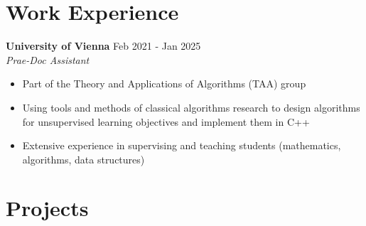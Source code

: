 \documentclass[a4paper, 10pt]{article}
\newcommand{\bulletSpace}{\vspace{-4pt}}
\newcommand{\secStartSpace}{\vspace{3pt}}
\newcommand{\secEndSpace}{\vspace{5pt}}
\newcommand{\workHeader}[3]{
\noindent \large{\textbf{\textcolor{text-color}{#1}}} \hfill \normalsize{#3}\vspace{2pt}\\
	\textit{#2}\vspace{-2pt}
}
\newcommand{\workSubHeader}[2]{
    \noindent \textit{#1} \hfill \normalsize{#2}
	\vspace{-2pt}
}
\newcommand{\boldlarger}[1]{{\large\textbf{\color{secondary}{#1}}}}
\newcommand{\justlarge}[1]{{\large \textbf{#1}}}
\begin{document}
\section{\color{highlight} \textbf{Work Experience}}
\secStartSpace
\begin{addmargin}[0.5em]{1em}
	\workHeader{University of Vienna}{Prae-Doc Assistant}{Feb 2021 - Jan 2025}
	\begin{itemize}
		\item Part of the Theory and Applications of Algorithms (TAA) group
		\item Using tools and methods of classical algorithms research to design algorithms for unsupervised learning objectives and implement them in C++
		\item Extensive experience in supervising and teaching students (mathematics, algorithms, data structures) %
	\end{itemize}
\end{addmargin}
\secEndSpace



\section{\color{highlight} \textbf{Projects}}
\secStartSpace
\end{document}
